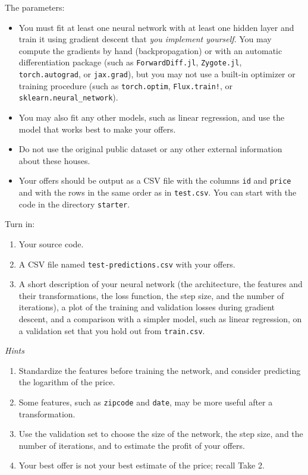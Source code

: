 \documentclass[letterpaper]{article}
\begin{document}
The parameters:
\begin{itemize}
\item You must fit at least one neural network with at least one hidden layer and train it using gradient descent that \emph{you implement yourself}. You may compute the gradients by hand (backpropagation) or with an automatic differentiation package (such as \texttt{ForwardDiff.jl}, \texttt{Zygote.jl}, \texttt{torch.autograd}, or \texttt{jax.grad}), but you may not use a built-in optimizer or training procedure (such as \texttt{torch.optim}, \texttt{Flux.train!}, or \texttt{sklearn.neural\_network}).
\item You may also fit any other models, such as linear regression, and use the model that works best to make your offers.
\item Do not use the original public dataset or any other external information about these houses.
\item Your offers should be output as a CSV file with the columns \texttt{id} and \texttt{price} and with the rows in the same order as in \texttt{test.csv}. You can start with the code in the directory \texttt{starter}.
\end{itemize}

Turn in:
\begin{enumerate}
\item Your source code.
\item A CSV file named \texttt{test-predictions.csv} with your offers.
\item A short description of your neural network (the architecture, the features and their transformations, the loss function, the step size, and the number of iterations), a plot of the training and validation losses during gradient descent, and a comparison with a simpler model, such as linear regression, on a validation set that you hold out from \texttt{train.csv}.
\end{enumerate}

\emph{Hints}
\begin{enumerate}
\item Standardize the features before training the network, and consider predicting the logarithm of the price.
\item Some features, such as \texttt{zipcode} and \texttt{date}, may be more useful after a transformation.
\item Use the validation set to choose the size of the network, the step size, and the number of iterations, and to estimate the profit of your offers.
\item Your best offer is not your best estimate of the price; recall Take 2.
\end{enumerate}
\end{document}
